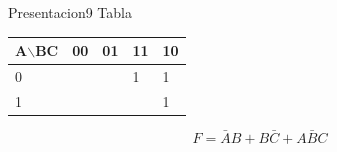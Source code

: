 \documentclass[presentation]{beamer}
\begin{document}
\begin{frame}[label={sec:orgde1e209}]{Presentacion9}
Tabla

\begin{center}
\begin{tabular}{|l|l|l|l|l|}
\hline
A$\backslash$BC & 00 & 01 & 11 & 10 \\
\hline
0 & & & 1 & 1 \\
\hline
1 & & & & 1 \\
\hline
\end{tabular}
\end{center}

$$F = \bar{A}B + B\bar{C}+A\bar{B}C$$
\end{frame}
\end{document}
